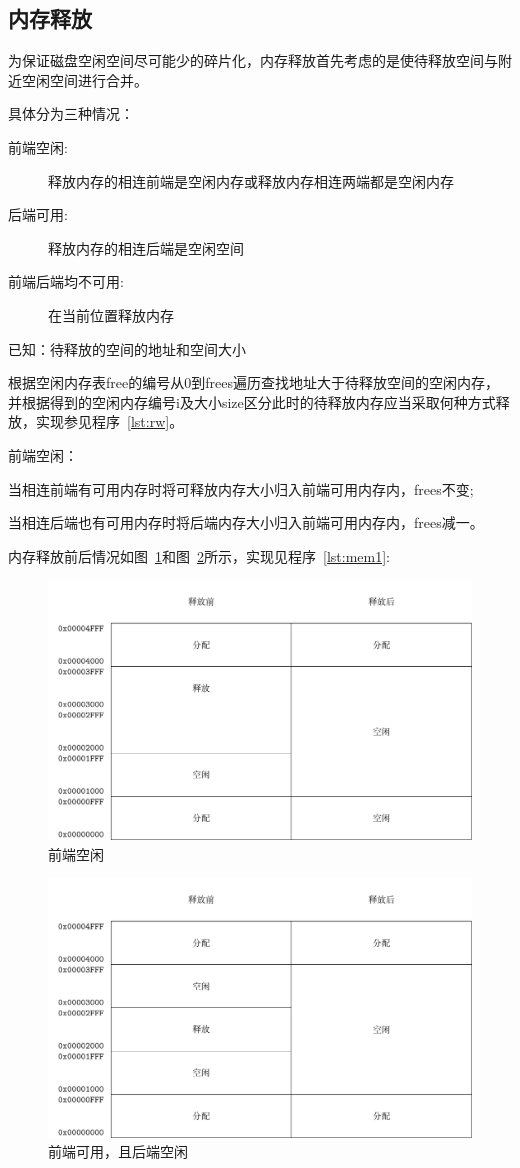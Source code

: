
\subsection{内存释放}

为保证磁盘空闲空间尽可能少的碎片化，内存释放首先考虑的是使待释放空间与附近空闲空间进行合并\cite{bryant2003computer}。

具体分为三种情况：

\begin{description}
\item[前端空闲:]释放内存的相连前端是空闲内存或释放内存相连两端都是空闲内存
\item[后端可用:]释放内存的相连后端是空闲空间
\item[前端后端均不可用:]在当前位置释放内存
\end{description}

已知：待释放的空间的地址和空间大小

根据空闲内存表free的编号从0到frees遍历查找地址大于待释放空间的空闲内存，
并根据得到的空闲内存编号i及大小size区分此时的待释放内存应当采取何种方式释放，实现参见程序~\ref{lst:rw}。

前端空闲：

当相连前端有可用内存时将可释放内存大小归入前端可用内存内，frees不变;

当相连后端也有可用内存时将后端内存大小归入前端可用内存内，frees减一。

内存释放前后情况如图~\ref{fig:mem0}和图~\ref{fig:mem1}所示，实现见程序~\ref{lst:mem1}: 

\begin{figure}[h]
  \centering
  \includegraphics[width=.7\textwidth]{fig/mem0.pdf}
  \caption{前端空闲}
  \label{fig:mem0}
\end{figure}

\begin{figure}[h]
  \centering
  \includegraphics[width=.7\textwidth]{fig/mem1.pdf}
  \caption{前端可用，且后端空闲}
  \label{fig:mem1}
\end{figure}

